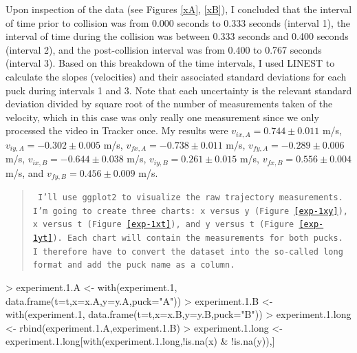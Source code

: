 \documentclass[11pt]{article}
\begin{document}
Upon inspection of the data (see Figures \ref{xA}, \ref{xB}), I concluded that the interval of time prior to collision was from 0.000 seconds to 0.333 seconds (interval 1), the interval of time during the collision was between 0.333 seconds and 0.400 seconds (interval 2), and the post-collision interval was from 0.400 to 0.767 seconds (interval 3). Based on this breakdown of the time intervals, I used LINEST to calculate the slopes (velocities) and their associated standard deviations for each puck during intervals 1 and 3. Note that each uncertainty is the relevant standard deviation divided by square root of the number of measurements taken of the velocity, which in this case was only really one measurement since we only processed the video in Tracker once. My results were $v_{ix,A} = 0.744\pm0.011$ m/s, $v_{iy,A} = -0.302\pm0.005$ m/s, $v_{fx,A} = -0.738\pm0.011$ m/s, $v_{fy,A} = -0.289\pm0.006$ m/s, $v_{ix,B} = -0.644\pm0.038$ m/s, $v_{iy,B} = 0.261\pm0.015$ m/s, $v_{fx,B} = 0.556\pm0.004$ m/s, and $v_{fy,B} = 0.456\pm0.009$ m/s.

\begin{quote}
{\tt 
I'll use ggplot2 to visualize the raw trajectory measurements. 
I'm going to create three charts: x versus y (Figure \ref{exp-1xy}), x versus t (Figure \ref{exp-1xt}), and y versus t (Figure \ref{exp-1yt}).
Each chart will contain the measurements for both pucks.
I therefore have to convert the dataset into the so-called long format and add the puck name as a column.
}
\end{quote}

\begin{Schunk}
\begin{Sinput}
> experiment.1.A <- with(experiment.1, data.frame(t=t,x=x.A,y=y.A,puck="A"))
> experiment.1.B <- with(experiment.1, data.frame(t=t,x=x.B,y=y.B,puck="B"))
> experiment.1.long <- rbind(experiment.1.A,experiment.1.B)
> experiment.1.long <- experiment.1.long[with(experiment.1.long,!is.na(x) & !is.na(y)),]
\end{Sinput}
\end{Schunk}
\end{document}
